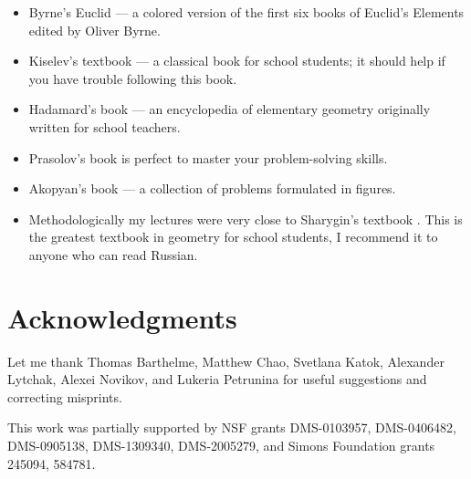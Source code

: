 \begin{itemize}
\item Byrne's Euclid \cite{byrne} --- a colored version of the first six books of Euclid's Elements edited by Oliver Byrne. 

\item Kiselev's textbook \cite{kiselev} ---
a classical book for school students; it should help if you have trouble following this book.

\item Hadamard's book \cite{hadamard} --- an encyclopedia of elementary geometry originally written for school teachers.



\item Prasolov's book \cite{prasolov} is perfect to master your problem-solving skills.

\item Akopyan's book \cite{akopyan} --- a collection of problems formulated in figures.

\item Methodologically my lectures
were very close to Sharygin's  textbook \cite{sharygin}.
This is the greatest textbook in geometry for school students,
I recommend it to anyone who can read Russian.

\end{itemize}

\section*{Acknowledgments}

{\sloppy

Let me thank 
Thomas Barthelme,
Matthew Chao, 
Svetlana Katok, 
Alexander Lytchak,
Alexei Novikov,
and Lukeria Petrunina
for useful suggestions and correcting misprints.

This work was partially supported by
NSF grants
DMS-0103957,
DMS-0406482,
DMS-0905138,
DMS-1309340,
DMS-2005279,
and Simons Foundation grants 
245094, 584781.

}



